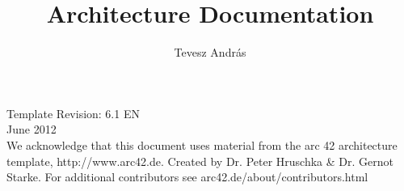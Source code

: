 
\begin{titlepage}
\author{Tevesz András} 
\title{Architecture Documentation} 
\date{} 
\maketitle

Template Revision: 6.1 EN\\
June 2012\\

We acknowledge that this document uses material from the arc 42 architecture 
template, http://www.arc42.de. Created by Dr. Peter Hruschka \& Dr. Gernot Starke. For additional contributors see arc42.de/about/contributors.html
\end{titlepage}
\newpage